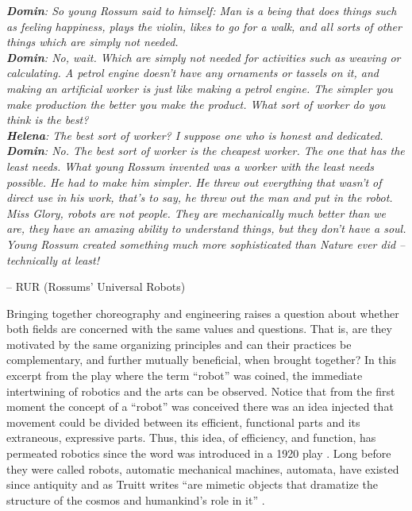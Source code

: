 \documentclass[arts,article,submit,moreauthors,pdftex,10pt,a4paper]{mdpi}
\begin{document}
\begin{flushleft}
\textit{\textbf{Domin}: So young Rossum said to himself: Man is a being that does things such as feeling happiness, plays the violin, likes to go for a walk, and all sorts of other things which are simply not needed.\\
\textbf{Domin}: No, wait.  Which are simply not needed for activities such as weaving or calculating.  A petrol engine doesn't have any ornaments or tassels on it, and making an artificial worker is just like making a petrol engine.  The simpler you make production the better you make the product.  What sort of worker do you think is the best?\\
\textbf{Helena}: The best sort of worker?  I suppose one who is honest and dedicated.\\
\textbf{Domin}: No.  The best sort of worker is the cheapest worker.  The one that has the least needs.  What young Rossum invented was a worker with the least needs possible.  He had to make him simpler.  He threw out everything that wasn't of direct use in his work, that's to say, he threw out the man and put in the robot.  Miss Glory, robots are not people.  They are mechanically much better than we are, they have an amazing ability to understand things, but they don't have a soul.  Young Rossum created something much more sophisticated than Nature ever did -- technically at least!}
\end{flushleft}
\vspace{-.2in}
\begin{flushright}
-- RUR (Rossums’ Universal Robots) \cite{vcapek2004rur}
\end{flushright}

Bringing together choreography and engineering raises a question about whether both fields are concerned with the same values and questions. That is, are they motivated by the same organizing principles and can their practices be complementary, and further mutually beneficial, when brought together? 
In this excerpt from the play where the term ``robot'' was coined, the immediate intertwining of robotics and the arts can be observed.  Notice that from the first moment the concept of a ``robot'' was conceived there was an idea injected that movement could be divided between its efficient, functional parts and its extraneous, expressive parts.  Thus, this idea, of efficiency, and function, has permeated robotics since the word was introduced in a 1920 play \cite{vcapek2004rur}.  Long before they were called robots, automatic mechanical machines, automata, have existed since antiquity and as Truitt writes ``are mimetic objects that dramatize the structure of the cosmos and humankind's role in it'' \cite{truitt2015medieval}.
\end{document}
